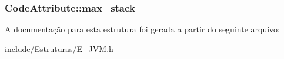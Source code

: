 \subsubsection[{max\+\_\+stack}]{ Code\+Attribute\+::max\+\_\+stack}\label{struct_code_attribute_a61e8f2685ef2bb170d72e402a0e72ca2}


A documentação para esta estrutura foi gerada a partir do seguinte arquivo\+:\begin{DoxyCompactItemize}
\item 
include/\+Estruturas/\hyperlink{_e___j_v_m_8h}{E\+\_\+\+J\+V\+M.\+h}\end{DoxyCompactItemize}
